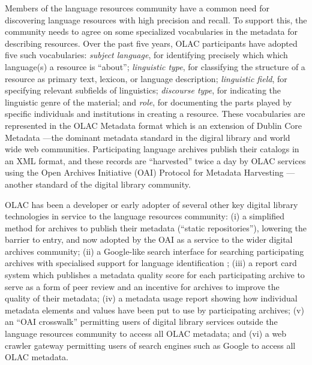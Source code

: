 Members of the language resources community have a common need for
discovering language resources with high precision and recall.  To
support this, the community needs to agree on
some specialized vocabularies in the metadata for
describing resources.  Over the past five years, OLAC
participants have adopted five such vocabularies:
\textit{subject language},
  for identifying precisely which which language(s) a resource is ``about'';
\textit{linguistic type},
  for classifying the structure of a resource as primary text,
  lexicon, or language description;
\textit{linguistic field},
  for specifying relevant subfields of linguistics;
\textit{discourse type},
  for indicating the linguistic genre of the material;
  and
\textit{role},
  for documenting the parts played by specific individuals and institutions
  in creating a resource.
These vocabularies are represented in the OLAC Metadata format
which is an extension of Dublin Core Metadata \citep{BirdSimons04metadata}---the dominant metadata standard in the
digiral library and world wide web communities.
Participating language archives publish their catalogs in an XML
format, and these records are ``harvested'' twice a day by OLAC services
using the Open Archives Initiative (OAI) Protocol for Metadata Harvesting
\citep{SimonsBird03lht}---another standard of the digital library community.


OLAC has been a developer or early adopter of several other key
digital library technologies in service to the language resources
community:
(i) a simplified method for archives to publish their metadata
  (``static repositories''), lowering the barrier to entry, and
  now adopted by the OAI as a service to the wider
  digital archives community;
(ii) a Google-like search interface for searching participating
  archives with specialised support for language identification
  \citep{HughesKamat05,Hughes06lrec};
(iii) a report card system which publishes a metadata quality score
  for each participating archive to serve as a form of
  peer review and an incentive for archives to improve the quality of
  their metadata;
(iv) a metadata usage report showing how individual metadata
  elements and values have been put to use by participating archives;
(v) an ``OAI crosswalk'' permitting users of digital library services
  outside the language resources community to access all OLAC metadata;
  and
(vi) a web crawler gateway permitting users of search engines such
  as Google to access all OLAC metadata.

